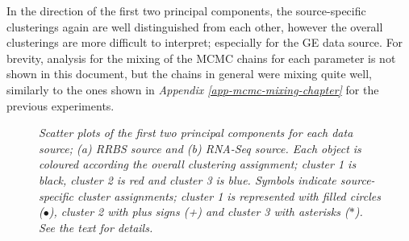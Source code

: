 In the direction of the first two principal components, the source-specific clusterings again are well distinguished from each other, however the overall clusterings are more difficult to interpret; especially for the GE data source. For brevity, analysis for the mixing of the MCMC chains for each parameter is not shown in this document, but the chains in general were mixing quite well, similarly to the ones shown in \emph{Appendix \ref{app-mcmc-mixing-chapter}} for the previous experiments.
\begin{figure}[ht!]
     \begin{center}
    \end{center}
    \caption{\emph{Scatter plots of the first two principal components for each data source; (a) RRBS source and (b) RNA-Seq source. Each object is coloured according the overall clustering assignment; cluster 1 is black, cluster 2 is red and cluster 3 is blue. Symbols indicate source-specific cluster assignments; cluster 1 is represented with filled circles ($\bullet$), cluster 2 with plus signs (+) and cluster 3 with asterisks ($\ast$). See the text for details.}}
   \label{bccMV-pic}
\end{figure}